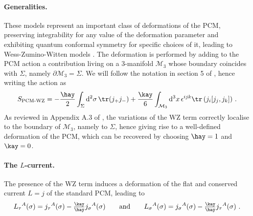 \documentclass[12pt]{article}
\numberwithin{equation}{section}
\begin{document}
\paragraph{Generalities.} These models \cite{Wess:1971yu,Novikov:1982ei} represent an important class of deformations of the PCM, preserving integrability for any value of the deformation parameter \cite{Abdalla:1982yd} and exhibiting quantum conformal symmetry for specific choices of it, leading to Wess-Zumino-Witten models \cite{Witten:1983ar}. The deformation is performed by adding to the PCM action a contribution living on a 3-manifold $\mathcal{M}_{3}$ whose boundary coincides with $\Sigma$, namely $\partial \mathcal{M}_{3}=\Sigma$. We will follow the notation in section 5 of \cite{Bielli:2024ach}, hence writing the action as
\begin{equation}\label{PCM_WZ}
S_{\text{PCM-WZ}} = - \frac{\hay}{2} \int_{\Sigma} \mathrm{d}^2 \sigma \, \tr ( j_+ j_- ) + \frac{\kay}{6} \int_{\mathcal{M}_3} \mathrm{d}^3 x \, \epsilon^{ijk} \tr \left( j_i [ j_j, j_k ] \right) \, .
\end{equation}
As reviewed in Appendix A.3 of \cite{Bielli:2024ach}, the variations of the WZ term correctly localise to the boundary of $\mathcal{M}_{3}$, namely to $\Sigma$, hence giving rise to a well-defined deformation of the PCM, which can be recovered by choosing $\hay = 1$ and $\kay=0$.

\paragraph{The $L$-current.} The presence of the WZ term induces a deformation of the flat and conserved current $L=j$ of the standard PCM, leading to 
\begin{equation}\label{PCM-WZ-BA-currents}
L_{\tau}{}^{A}(\sigma)=j_{\tau}{}^{A}(\sigma)-\tfrac{\kay}{\hay}j_{\sigma}{}^{A}(\sigma)
\qquad \text{and} \qquad 
L_{\sigma}{}^{A}(\sigma)=j_{\sigma}{}^{A}(\sigma)-\tfrac{\kay}{\hay}j_{\tau}{}^{A}(\sigma) \,\, .
\end{equation}
\end{document}
